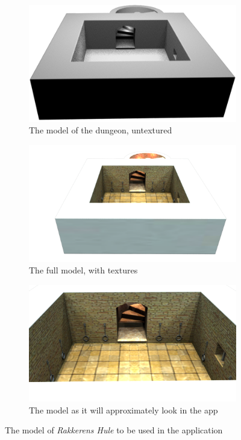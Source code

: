 \begin{figure}
    \centering
        \begin{subfigure}[h!]{0.7\textwidth}
    	\centering
        \includegraphics[width=\textwidth]{figures/model.png}
        \caption{The model of the dungeon, untextured}\label{fig:model}
    \end{subfigure}
    \begin{subfigure}[h!]{0.7\textwidth}
    	\centering
        \includegraphics[width=\textwidth]{figures/model_total.png}
        \caption{The full model, with textures}\label{fig:total}
    \end{subfigure}
    \begin{subfigure}[h!]{0.7\textwidth}
    	\centering
        \includegraphics[width=\textwidth]{figures/model_long.png}
        \caption{The model as it will approximately look in the app}\label{fig:long}
    \end{subfigure}
    \caption{The model of \textit{Rakkerens Hule} to be used in the application}
\end{figure}

